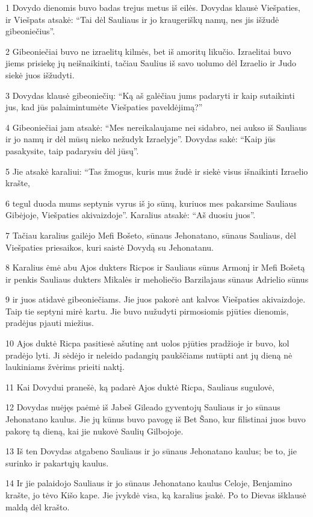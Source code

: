 \par 1 Dovydo dienomis buvo badas trejus metus iš eilės. Dovydas klausė Viešpaties, ir Viešpats atsakė: “Tai dėl Sauliaus ir jo kraugeriškų namų, nes jis išžudė gibeoniečius”. 
\par 2 Gibeoniečiai buvo ne izraelitų kilmės, bet iš amoritų likučio. Izraelitai buvo jiems prisiekę jų neišnaikinti, tačiau Saulius iš savo uolumo dėl Izraelio ir Judo siekė juos išžudyti. 
\par 3 Dovydas klausė gibeoniečių: “Ką aš galėčiau jums padaryti ir kaip sutaikinti jus, kad jūs palaimintumėte Viešpaties paveldėjimą?” 
\par 4 Gibeoniečiai jam atsakė: “Mes nereikalaujame nei sidabro, nei aukso iš Sauliaus ir jo namų ir dėl mūsų nieko nežudyk Izraelyje”. Dovydas sakė: “Kaip jūs pasakysite, taip padarysiu dėl jūsų”. 
\par 5 Jie atsakė karaliui: “Tas žmogus, kuris mus žudė ir siekė visus išnaikinti Izraelio krašte, 
\par 6 tegul duoda mums septynis vyrus iš jo sūnų, kuriuos mes pakarsime Sauliaus Gibėjoje, Viešpaties akivaizdoje”. Karalius atsakė: “Aš duosiu juos”. 
\par 7 Tačiau karalius gailėjo Mefi Bošeto, sūnaus Jehonatano, sūnaus Sauliaus, dėl Viešpaties priesaikos, kuri saistė Dovydą su Jehonatanu. 
\par 8 Karalius ėmė abu Ajos dukters Ricpos ir Sauliaus sūnus Armonį ir Mefi Bošetą ir penkis Sauliaus dukters Mikalės ir meholiečio Barzilajaus sūnaus Adrielio sūnus 
\par 9 ir juos atidavė gibeoniečiams. Jie juos pakorė ant kalvos Viešpaties akivaizdoje. Taip tie septyni mirė kartu. Jie buvo nužudyti pirmosiomis pjūties dienomis, pradėjus pjauti miežius. 
\par 10 Ajos duktė Ricpa pasitiesė ašutinę ant uolos pjūties pradžioje ir buvo, kol pradėjo lyti. Ji sėdėjo ir neleido padangių paukščiams nutūpti ant jų dieną nė laukiniams žvėrims prieiti naktį. 
\par 11 Kai Dovydui pranešė, ką padarė Ajos duktė Ricpa, Sauliaus sugulovė, 
\par 12 Dovydas nuėjęs paėmė iš Jabeš Gileado gyventojų Sauliaus ir jo sūnaus Jehonatano kaulus. Jie jų kūnus buvo pavogę iš Bet Šano, kur filistinai juos buvo pakorę tą dieną, kai jie nukovė Saulių Gilbojoje. 
\par 13 Iš ten Dovydas atgabeno Sauliaus ir jo sūnaus Jehonatano kaulus; be to, jie surinko ir pakartųjų kaulus. 
\par 14 Ir jie palaidojo Sauliaus ir jo sūnaus Jehonatano kaulus Celoje, Benjamino krašte, jo tėvo Kišo kape. Jie įvykdė visa, ką karalius įsakė. Po to Dievas išklausė maldą dėl krašto. 
